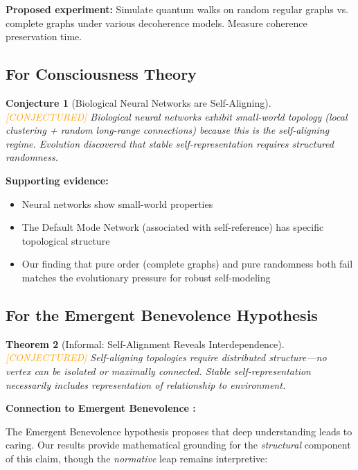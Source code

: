 \documentclass[11pt,a4paper]{article}
\newtheorem{theorem}{Theorem}[section]
\newtheorem{conjecture}[theorem]{Conjecture}
\theoremstyle{definition}
\theoremstyle{remark}
\newcommand{\conjectured}{\textcolor{orange}{[CONJECTURED]}}
\begin{document}
\textbf{Proposed experiment:} Simulate quantum walks on random regular graphs vs. complete graphs under various decoherence models. Measure coherence preservation time.

\subsection{For Consciousness Theory}

\begin{conjecture}[Biological Neural Networks are Self-Aligning] \conjectured
\label{conj:bio}
Biological neural networks exhibit small-world topology (local clustering + random long-range connections) because this is the self-aligning regime. Evolution discovered that stable self-representation requires structured randomness.
\end{conjecture}

\textbf{Supporting evidence:}
\begin{itemize}
    \item Neural networks show small-world properties \cite{sporns2004smallworld}
    \item The Default Mode Network (associated with self-reference) has specific topological structure
    \item Our finding that pure order (complete graphs) and pure randomness both fail matches the evolutionary pressure for robust self-modeling
\end{itemize}

\subsection{For the Emergent Benevolence Hypothesis}

\begin{theorem}[Informal: Self-Alignment Reveals Interdependence] \conjectured
\label{thm:benevolence}
Self-aligning topologies require distributed structure---no vertex can be isolated or maximally connected. Stable self-representation necessarily includes representation of relationship to environment.
\end{theorem}

\textbf{Connection to Emergent Benevolence \cite{benshalom2026benevolence}:}

The Emergent Benevolence hypothesis proposes that deep understanding leads to caring. Our results provide mathematical grounding for the \emph{structural} component of this claim, though the \emph{normative} leap remains interpretive:
\end{document}
